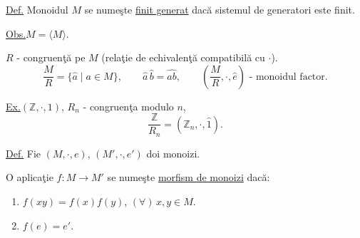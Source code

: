 \bigskip
\noindent\underline{Def.}\quad
Monoidul $M$ se nume\c{s}te \underline{finit generat}
dac\u{a} sistemul de generatori este finit.

\medskip
\noindent\underline{Obs.}\quad $M=\langle M\rangle$.

\bigskip
\noindent $R$ - congruen\c{t}\u{a} pe $M$
(rela\c{t}ie de echivalen\c{t}\u{a} compatibil\u{a} cu $\cdot$).
\[
\frac{M}{R}=\{\hat a\mid a\in M\},
\qquad \hat a\,\hat b=\widehat{ab},
\qquad \left(\frac{M}{R},\cdot,\hat e\right)
\text{ - monoidul factor.}
\]

\bigskip
\noindent\underline{Ex.}\quad $(\mathbb{Z},\cdot,1)$, $R_n$ - congruen\c{t}a modulo $n$,
\[
\frac{\mathbb{Z}}{R_n}=(\mathbb{Z}_n,\cdot,\hat 1).
\]

\bigskip
\noindent\underline{Def.}\quad
Fie $(M,\cdot,e)$, $(M',\cdot,e')$ doi monoizi.

\noindent O aplica\c{t}ie $f:M\to M'$ se nume\c{s}te
\underline{morfism de monoizi} dac\u{a}:
\begin{enumerate}
\item[(1)] $f(xy)=f(x)f(y)$, $(\forall)\,x,y\in M$.
\item[(2)] $f(e)=e'$.
\end{enumerate}
